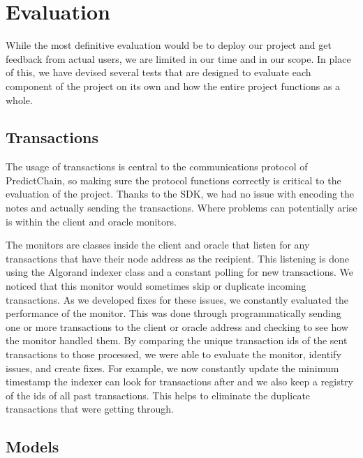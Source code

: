 \documentclass{ledger}
\begin{document}
\section{Evaluation}

While the most definitive evaluation would be to deploy our project and get feedback from actual users, we are limited
in our time and in our scope.  In place of this, we have devised several tests that are designed to evaluate each
component of the project on its own and how the entire project functions as a whole.

\subsection{Transactions}

The usage of transactions is central to the communications protocol of PredictChain, so making sure the protocol
functions correctly is critical to the evaluation of the project.  Thanks to the SDK, we had no issue with encoding the
notes and actually sending the transactions.  Where problems can potentially arise is within the
client and oracle monitors.

The monitors are classes inside the client and oracle that listen for any transactions that have their node address
as the recipient.  This listening is done using the Algorand indexer class and a constant polling for new transactions.
We noticed that this monitor would sometimes skip or duplicate incoming transactions.  As we developed fixes for
these issues, we constantly evaluated the performance of the monitor.  This was done through programmatically sending
one or more transactions to the client or oracle address and checking to see how the monitor handled them.  By comparing
the unique transaction ids of the sent transactions to those processed, we were able to evaluate the monitor,
identify issues, and create fixes. For example, we now constantly update the minimum timestamp the indexer can look
for transactions after and we also keep a registry of the ids of all past transactions.  This helps to eliminate
the duplicate transactions that were getting through.

\subsection{Models}
\end{document}
